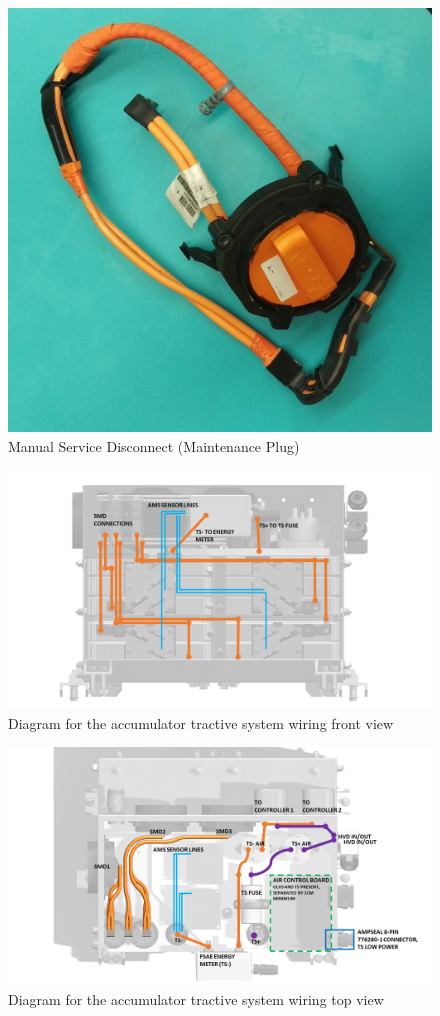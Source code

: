 \documentclass{article}
\begin{document}
            \begin{figure}[H]
                \centering
                \includegraphics[width = 0.5 \textwidth]{msd_highres}
                \caption{Manual Service Disconnect (Maintenance Plug)}
                \label{msd03}
            \end{figure}

            \begin{figure}[H]
                \centering
                \includegraphics[width = 0.5 \textwidth]{TRACTIVE_DIAGRAM_2}
                \caption{Diagram for the accumulator tractive system wiring front view}
                \label{tswiring_front}
            \end{figure}

            \begin{figure}[H]
                \centering
                \includegraphics[width = 0.5 \textwidth]{TRACTIVE_DIAGRAM_3}
                \caption{Diagram for the accumulator tractive system wiring top view }
                \label{tswiring_top}
            \end{figure}
\end{document}
